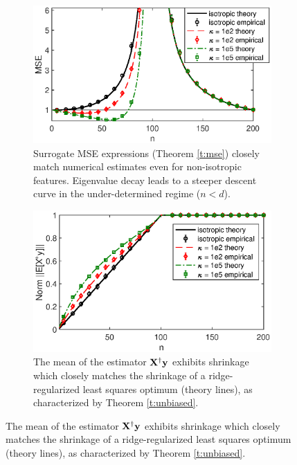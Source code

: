 \documentclass[11pt]{article}
\begin{document}
\begin{figure}[h]
\centering
\begin{subfigure}[t]{0.48\textwidth}
    \includegraphics[width=\textwidth]{figs/descent-intro}
  \caption{
Surrogate MSE expressions (Theorem \ref{t:mse}) closely match
numerical estimates even for non-isotropic
features. Eigenvalue decay leads to a steeper 
descent curve in the under-determined regime ($n<d$).}
\end{subfigure}
\hfill
\begin{subfigure}[t]{0.48\textwidth}
    \includegraphics[width=\textwidth]{figs/descent-shrinkage}
  \caption{
    The mean of the estimator $\mathbf X^\dagger\mathbf y$ exhibits
    shrinkage which closely matches the shrinkage of a
    ridge-regularized least squares optimum (theory lines), as characterized by
    Theorem \ref{t:unbiased}.}
\end{subfigure}

\end{figure}
\end{document}
